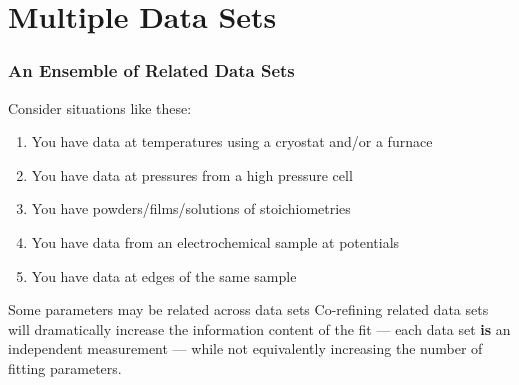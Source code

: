 \documentclass[10pt, xcolor=x11names, compress]{beamer}
\begin{document}
\section[MDS]{Multiple Data Sets}

\begin{frame}
  \frametitle{An Ensemble of Related Data Sets}

  Consider situations like these:
  \begin{enumerate}
  \item You have data at {\multiple} temperatures using a cryostat
    and/or a furnace
  \item You have data at {\multiple} pressures from a high pressure cell
  \item You have powders/films/solutions of {\multiple} stoichiometries
  \item You have data from an electrochemical sample at {\multiple} potentials
  \item You have data at {\multiple} edges of the same sample
  \end{enumerate}

  \bigskip

  \begin{block}{Some parameters may be related across data sets}
    Co-refining related data sets will dramatically increase the
    information content of the fit --- each data set \textbf{is} an
    independent measurement --- while not equivalently increasing the
    number of fitting parameters.
  \end{block}
\end{frame}
\end{document}
